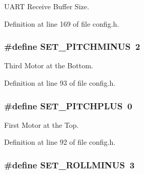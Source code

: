 U\-A\-R\-T Receive Buffer Size. 



Definition at line 169 of file config.\-h.

\hypertarget{group__config_ga8c969dbb07dc504226fc2c69484b9768}{
\subsubsection[{S\-E\-T\-\_\-\-P\-I\-T\-C\-H\-M\-I\-N\-U\-S}]{\setlength{\rightskip}{0pt plus 5cm}\#define S\-E\-T\-\_\-\-P\-I\-T\-C\-H\-M\-I\-N\-U\-S~2}}\label{group__config_ga8c969dbb07dc504226fc2c69484b9768}


Third Motor at the Bottom. 



Definition at line 93 of file config.\-h.

\hypertarget{group__config_gaf0a00d922db66d875ca53f6db34e7307}{
\subsubsection[{S\-E\-T\-\_\-\-P\-I\-T\-C\-H\-P\-L\-U\-S}]{\setlength{\rightskip}{0pt plus 5cm}\#define S\-E\-T\-\_\-\-P\-I\-T\-C\-H\-P\-L\-U\-S~0}}\label{group__config_gaf0a00d922db66d875ca53f6db34e7307}


First Motor at the Top. 



Definition at line 92 of file config.\-h.

\hypertarget{group__config_ga9921670161925a1d7b946aeb65d5767a}{
\subsubsection[{S\-E\-T\-\_\-\-R\-O\-L\-L\-M\-I\-N\-U\-S}]{\setlength{\rightskip}{0pt plus 5cm}\#define S\-E\-T\-\_\-\-R\-O\-L\-L\-M\-I\-N\-U\-S~3}}\label{group__config_ga9921670161925a1d7b946aeb65d5767a}


